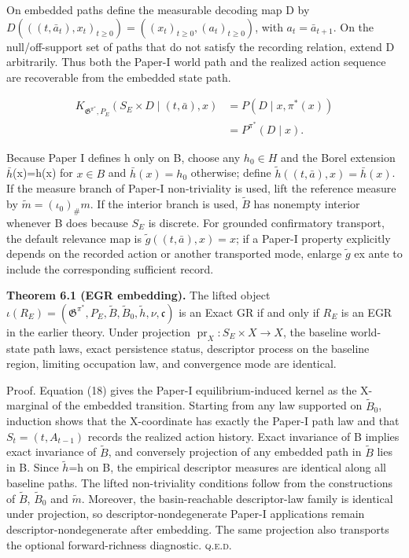\documentclass[10pt]{article}
\newcommand{\push}{\mathord{\#}}
\begin{document}
On embedded paths define the measurable decoding map D by
\(D(((t,\bar a_t),x_t)_{t\ge{}0})=((x_t)_{t\ge{}0},(a_t)_{t\ge{}0})\),
with \(a_t=\bar a_{t+1}\). On the null/off-support set of paths that do
not satisfy the recording relation, extend D arbitrarily. Thus both the
Paper-I world path and the realized action sequence are recoverable from
the embedded state path.

\begin{equation}
\begin{aligned}K_{\mathfrak G^{\pi^\ast},P_E}(S_E\times D\mid(t,\bar a),x)&=P(D\mid x,\pi^\ast(x))\\&=P^{\pi^\ast}(D\mid x).\end{aligned}
\tag{18}\label{eq:18}
\end{equation}

Because Paper I defines h only on B, choose any \(h_0\in{}H\) and the
Borel extension \ensuremath{\bar h}(x)=h(x) for \(x\in{}B\) and \(\bar h(x)=h_0\)
otherwise; define \(\widetilde h((t,\bar a),x)=\bar h(x)\). If the
measure branch of Paper-I non-triviality is used, lift the reference
measure by \(\widetilde m=(\iota_0)_{\push}m\). If the interior branch
is used, \ensuremath{\widetilde B} has nonempty interior whenever B does because \(S_E\) is
discrete. For grounded confirmatory transport, the default relevance map
is \(\widetilde g((t,\bar a),x)=x\); if a Paper-I property explicitly
depends on the recorded action or another transported mode, enlarge \ensuremath{\widetilde g} ex
ante to include the corresponding sufficient record.

\textbf{Theorem 6.1 (EGR embedding).} The lifted object
\(\iota(R_E)=(\mathfrak G^{\pi^\ast},P_E,\widetilde B,\widetilde B_0,\widetilde h,\nu,\mathfrak c)\)
is an Exact GR if and only if \(R_E\) is an EGR in the earlier theory.
Under projection \(\operatorname{pr}_X:S_E\times{}X\to{}X\), the
baseline world-state path laws, exact persistence status, descriptor
process on the baseline region, limiting occupation law, and convergence
mode are identical.

Proof. Equation (18) gives the Paper-I equilibrium-induced kernel as the
X-marginal of the embedded transition. Starting from any law supported
on \(\widetilde B_0\), induction shows that the X-coordinate has exactly
the Paper-I path law and that \(S_t=(t,A_{t-1})\) records the realized
action history. Exact invariance of B implies exact invariance of \ensuremath{\widetilde B}, and
conversely projection of any embedded path in \ensuremath{\widetilde B} lies in B. Since \ensuremath{\widetilde h}=h on
B, the empirical descriptor measures are identical along all baseline
paths. The lifted non-triviality conditions follow from the
constructions of \ensuremath{\widetilde B}, \(\widetilde B_0\) and \ensuremath{\widetilde m}. Moreover, the
basin-reachable descriptor-law family is identical under projection, so
descriptor-nondegenerate Paper-I applications remain
descriptor-nondegenerate after embedding. The same projection also
transports the optional forward-richness diagnostic. \hfill\textsc{q.e.d.}
\end{document}
